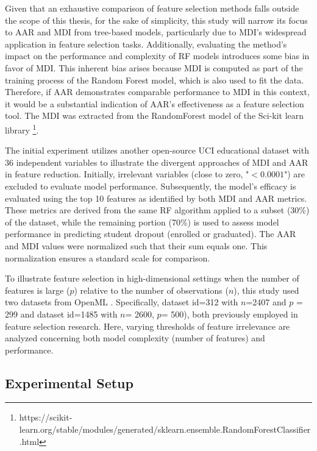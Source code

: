 Given that an exhaustive comparison of feature selection methods falls outside the scope of this thesis, for the sake of simplicity, this study will narrow its focus to AAR and MDI from tree-based models, particularly due to MDI's widespread application in feature selection tasks. Additionally, evaluating the method's impact on the performance and complexity of RF models introduces some bias in favor of MDI. This inherent bias arises because MDI is computed as part of the training process of the Random Forest model, which is also used to fit the data. Therefore, if AAR demonstrates comparable performance to MDI in this context, it would be a substantial indication of AAR's effectiveness as a feature selection tool. The MDI was extracted from the RandomForest model of the Sci-kit learn library \footnote{https://scikit-learn.org/stable/modules/generated/sklearn.ensemble.RandomForestClassifier.html}. 

The initial experiment utilizes another open-source UCI educational dataset \cite{RealinhoValentim2021PredictSuccess} with 36 independent variables to illustrate the divergent approaches of MDI and AAR in feature reduction. Initially, irrelevant variables (close to zero, "\(< 0.0001\)") are excluded to evaluate model performance. Subsequently, the model's efficacy is evaluated using the top 10 features as identified by both MDI and AAR metrics. These metrics are derived from the same RF algorithm applied to a subset (30\%) of the dataset, while the remaining portion (70\%) is used to assess model performance in predicting student dropout (enrolled or graduated). The AAR and MDI values were normalized such that their sum equals one. This normalization ensures a standard scale for comparison. 

To illustrate feature selection in high-dimensional settings when the number of features is large (\(p\)) relative to the number of observations (\(n\)), this study used two datasets from OpenML \cite{Vanschoren2014OpenML}. Specifically, dataset id=312 with \(n\)=2407 and \(p\) = 299 and dataset id=1485 with \(n\)= 2600, \(p\)= 500), both previously employed in feature selection research. Here, varying thresholds of feature irrelevance are analyzed concerning both model complexity (number of features) and performance.





\subsection{Experimental Setup}

